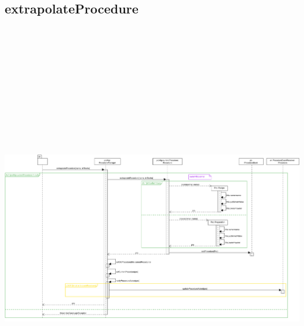 \subsection{extrapolateProcedure}
\includegraphics[max width=\textwidth, max height=190mm]{../resources/img/GRP/DSD/op7d.png}
\endgroup
\endgroup